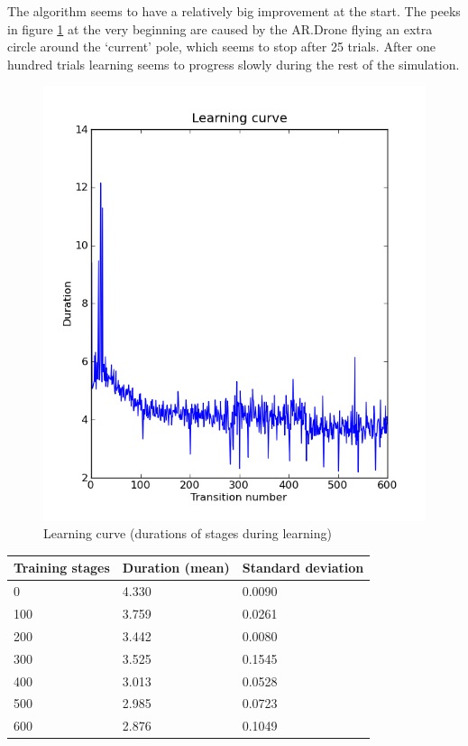 \documentclass[11pt]{article}
\begin{document}
The algorithm seems to have a relatively big improvement at the start. The peeks in figure \ref{fig:learning_curve} at the very beginning are caused by the AR.Drone flying an extra circle around the `current' pole, which seems to stop after 25 trials. After one hundred trials learning seems to progress slowly during the rest of the simulation.

  \begin{figure}[H]
    \begin{center}
    \includegraphics[width=1\textwidth]{img/learning_curve}
    \caption{Learning curve (durations of stages during learning)}
    \label{fig:learning_curve}
    \end{center}
  \end{figure}

\begin{center}
 \begin{tabular}{ l | l | l }
 \textbf{Training stages} & \textbf{Duration (mean)} & \textbf{Standard deviation} \\ \hline
   0    & 4.330 & 0.0090 \\
 100    & 3.759 & 0.0261 \\
 200    & 3.442 & 0.0080 \\
 300    & 3.525 & 0.1545 \\
 400    & 3.013 & 0.0528 \\
 500    & 2.985 & 0.0723 \\
 600    & 2.876 & 0.1049
 \label{tab:means}
 \end{tabular}
\end{center}
\end{document}
